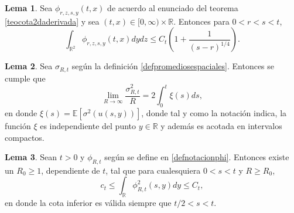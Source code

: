 \documentclass[letterpaper,twoside,12pt]{book}
\newcommand{\R}{\mathbb{R}}
\newcommand{\E}{\mathbb{E}}
\newcommand{\1}{\mathds{1}}
\renewcommand{\to}{\rightarrow}
\theoremstyle{definition}
\theoremstyle{definition}
\theoremstyle{remark}
\theoremstyle{definition}
\theoremstyle{definition}
\theoremstyle{definition}
\theoremstyle{definition}
\theoremstyle{definition}
\newtheorem{lema}{Lema}
\begin{document}
\begin{lema}\label{lemaA.2}
 Sea $\phi_{r,z,s,y}(t,x)$ de acuerdo al enunciado del teorema \ref{teocota2daderivada} y sea $(t,x)\in [0,\infty)\times\R$. Entonces para $0<r<s<t$,
 \[
 \int_{\R^2}\phi_{r,z,s,y}(t,x)dydz\leq C_t \left(1+\frac{1}{(s-r)^{1/4}}\right).
 \]
 \end{lema}
 \begin{lema}\label{lemaA.3a} 
  Sea $\sigma_{R,t}$ según la definición \ref{defpromediosespaciales}. Entonces se cumple que 
  \[
      \lim_{R\to\infty}\frac{\sigma_{R,t}^2}{R}=2\int_{0}^{t}\xi(s)ds,
  \] 
  en donde $\xi(s)=\E\left[\sigma^2(u(s,y))\right]$, donde tal y como la notación indica, la función $\xi$ es independiente del punto $y\in \R$ y además es acotada en intervalos compactos.
  \end{lema}
  \begin{lema}\label{LemaA.4a}
   Sean $t>0$ y $\phi_{R,t}$ según se define en \eqref{defnotacionphi}. Entonces existe un $R_0\geq1$, dependiente de $t$, tal que para cualesquiera $0<s<t$ y $R\geq R_0$,
   \[
      c_t\leq \int_\R\phi_{R,t}^2(s,y)dy\leq C_t,
   \]
   en donde la cota inferior es válida siempre que $t/2<s<t$.
  \end{lema}
\nocite{*}
\backmatter


\end{document}

